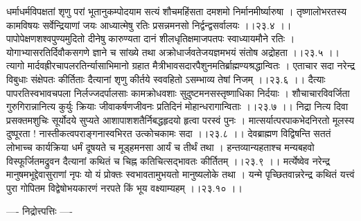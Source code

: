 \documentclass[11pt]{book}
\begin{document}
\begin{landscape}
धर्माधर्मविपक्षतां शृणु परां भूतानुकम्पोदयाम
सत्यं शौचमहिंसता दमशमो निर्मानमीर्ष्यारुषा ।
तृष्णालोभरतस्य कामविषयः सर्वेन्द्रियाणां जयः
आध्यात्मेषु रतिः प्रसन्नमनसो निर्द्वन्द्वसर्वालयः ।।२३.४ ।।
पापोपेक्षणशश्वपुण्यमुदितो दीनेषु कारुण्यता
दानं शीलधृतिक्षमाजपतपः स्वाध्यायमौने रतिः ।
योगाभ्यासरतिर्दिवौकसगणे ज्ञाने च सांख्ये तथा
अक्रोधार्जवतेजयज्ञमभयं संतोष अद्रोहता ।।२३.५ ।।
त्यागो मार्दवह्रीरचापलरतिर्न्यासाभिमानो ग्रहात
मैत्रीभावसदारपैशुनमतिर्ब्राह्मण्यश्रद्धान्वितः ।
एताचार सदा नरेन्द्र विबुधाः संक्षेपतः कीर्तिताः
दैत्यानां शृणु कीर्तये स्ववहितो ऽसम्भाव्य तेषां निजम् ।।२३.६ ।।
दैत्याः पापरतिस्वभावचपला निर्लज्जदर्पालसाः
कामक्रोधवशाः सुदुष्टमनसस्तृष्णाधिका निर्दयाः ।
शौचाचारविवर्जिता गुरुगिरान्नानित्य कुर्युः क्रियाः
जीवाकर्षणजीवनः प्रतिदिनं मोहान्धरागान्विताः ।।२३.७ ।।
निद्रा नित्य दिवा प्रसक्तमशुचिः सूर्योदये सुप्यते
आशापाशशतैर्निबद्धहृदयो हृत्वा परस्वं पुनः ।
मात्सर्यात्परपाकभेदनिरतो मूलस्य दुष्पूरता
! नास्तीकत्वपराङ्गनास्वभिरत उत्कोचकामः सदा ।।२३.८ ।।
देवब्राह्मण विद्विषन्ति सततं लोभाच्च कार्यक्रिया
धर्मं दूषयते च मूड्हमनसा आर्यं च तीर्थं तथा ।
हन्तव्यान्यहताश्च मन्यबहवो विस्फूर्जितमद्रुवन
दैत्यानां कथितं च चिह्न कतिचित्सद्भावतः कीर्तितम् ।।२३.९ ।।
मर्त्येष्वेव नरेन्द्र मानुषमभूद्देवासुराणां नृपः
यो यं प्रोक्तः स्वभावतामुभयतो मानुष्यलोके तथा ।
यन्मे पृच्छितवान्नरेन्द्र कथितं यत्त्वं पुरा गोपितम
विद्वेषोभयकारणं नरपते किं भूय वक्ष्याम्यहम् ।।२३.१० ।।

---- निद्रोत्त्पत्तिः ----


\end{landscape}
\end{document}
